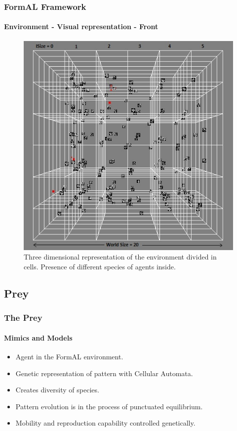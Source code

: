 \frame
{
	\frametitle{FormAL Framework}
	\framesubtitle{Environment - Visual representation - Front}

	\begin{figure}[H]
		\centering
		\includegraphics[scale=0.40]{../tex/images/cells-front}
		\caption{Three dimensional representation of the environment divided in cells. Presence of different species of agents inside.}
	\label{tab:3-d-environment-images-1}
	\end{figure}	
}

\subsection{Prey}

\frame
{
	\frametitle{The Prey}
	\framesubtitle{Mimics and Models}
	
	\begin{itemize}
		\item Agent in the FormAL environment.
		\item Genetic representation of pattern with Cellular Automata.
		\item Creates diversity of species.
		\item Pattern evolution is in the process of punctuated equilibrium.
		\item Mobility and reproduction capability controlled genetically.
	\end{itemize}
}


